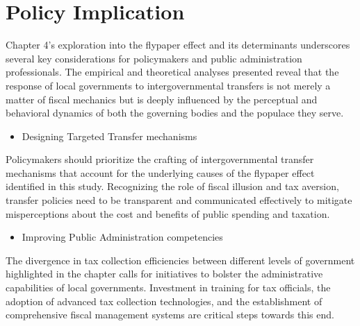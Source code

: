 
\section{Policy Implication}

Chapter 4's exploration into the flypaper effect and its determinants underscores several key considerations for policymakers and public administration professionals. The empirical and theoretical analyses presented reveal that the response of local governments to intergovernmental transfers is not merely a matter of fiscal mechanics but is deeply influenced by the perceptual and behavioral dynamics of both the governing bodies and the populace they serve.

\begin{itemize}
    \item  Designing Targeted Transfer mechanisms
\end{itemize}

Policymakers should prioritize the crafting of intergovernmental transfer mechanisms that account for the underlying causes of the flypaper effect identified in this study. Recognizing the role of fiscal illusion and tax aversion, transfer policies need to be transparent and communicated effectively to mitigate misperceptions about the cost and benefits of public spending and taxation.

\begin{itemize}
    \item Improving Public Administration competencies
\end{itemize}

The divergence in tax collection efficiencies between different levels of government highlighted in the chapter calls for initiatives to bolster the administrative capabilities of local governments. Investment in training for tax officials, the adoption of advanced tax collection technologies, and the establishment of comprehensive fiscal management systems are critical steps towards this end.

